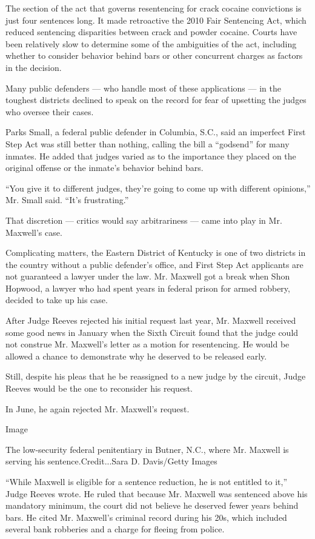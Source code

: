The section of the act that governs resentencing for crack cocaine
convictions is just four sentences long. It made retroactive the 2010
Fair Sentencing Act, which reduced sentencing disparities between crack
and powder cocaine. Courts have been relatively slow to determine some
of the ambiguities of the act, including whether to consider behavior
behind bars or other concurrent charges as factors in the decision.

Many public defenders --- who handle most of these applications --- in
the toughest districts declined to speak on the record for fear of
upsetting the judges who oversee their cases.

Parks Small, a federal public defender in Columbia, S.C., said an
imperfect First Step Act was still better than nothing, calling the bill
a ``godsend'' for many inmates. He added that judges varied as to the
importance they placed on the original offense or the inmate's behavior
behind bars.

``You give it to different judges, they're going to come up with
different opinions,'' Mr. Small said. ``It's frustrating.''

That discretion --- critics would say arbitrariness --- came into play
in Mr. Maxwell's case.

Complicating matters, the Eastern District of Kentucky is one of two
districts in the country without a public defender's office, and First
Step Act applicants are not guaranteed a lawyer under the law. Mr.
Maxwell got a break when Shon Hopwood, a lawyer who had spent years in
federal prison for armed robbery, decided to take up his case.

After Judge Reeves rejected his initial request last year, Mr. Maxwell
received some good news in January when the Sixth Circuit found that the
judge could not construe Mr. Maxwell's letter as a motion for
resentencing. He would be allowed a chance to demonstrate why he
deserved to be released early.

Still, despite his pleas that he be reassigned to a new judge by the
circuit, Judge Reeves would be the one to reconsider his request.

In June, he again rejected Mr. Maxwell's request.

Image

The low-security federal penitentiary in Butner, N.C., where Mr. Maxwell
is serving his sentence.Credit...Sara D. Davis/Getty Images

``While Maxwell is eligible for a sentence reduction, he is not entitled
to it,'' Judge Reeves wrote. He ruled that because Mr. Maxwell was
sentenced above his mandatory minimum, the court did not believe he
deserved fewer years behind bars. He cited Mr. Maxwell's criminal record
during his 20s, which included several bank robberies and a charge for
fleeing from police.

